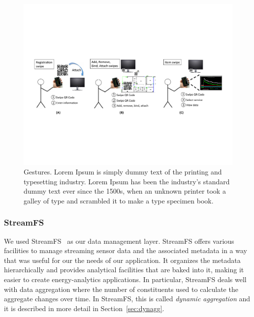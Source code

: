 
\begin{figure}[htb!]
\begin{center}
\includegraphics[width=\textwidth]{figs/swipes}
\caption{Gestures. Lorem Ipsum is simply dummy text of the printing and typesetting industry. Lorem Ipsum has 
been the industry's standard dummy text ever since the 1500s, when an unknown printer took a galley of 
type and scrambled it to make a type specimen book.  }
\label{fig:gestures}
\end{center}
\end{figure}

\subsubsection{StreamFS}
\label{sec:streamfs}
We used StreamFS~\cite{streamfs} as our data management layer.  StreamFS offers various
facilities to manage streaming sensor data and the associated metadata in a way that was useful for our the needs
of our application.  It organizes the metadata hierarchically and provides analytical
facilities that are baked into it, making it easier to create energy-analytics applications.  In particular,
StreamFS deals well with data aggregation where the number of constituents used to calculate the aggregate
changes over time.  In StreamFS, this is called \emph{dynamic aggregation} and it is described in more detail
in Section~\ref{sec:dynagg}.

